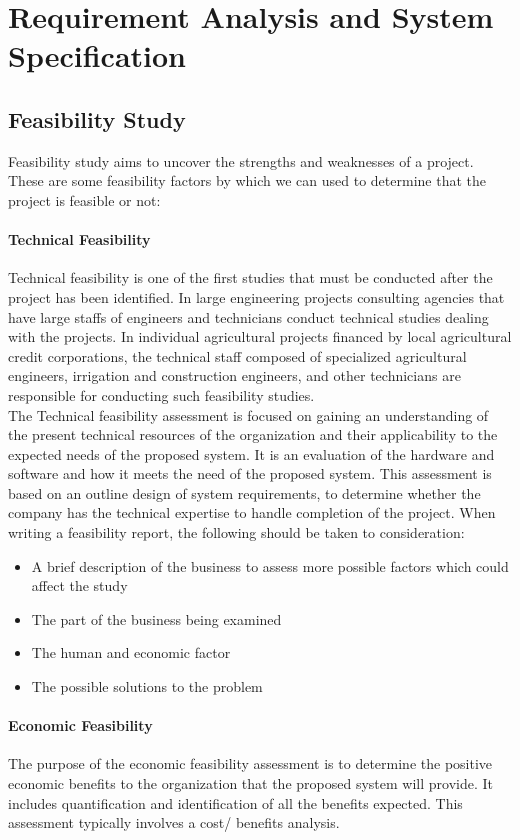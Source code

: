 \chapter{Requirement Analysis and System Specification}

\section{Feasibility Study}
Feasibility study aims to uncover the strengths and weaknesses of
a project. These are some feasibility factors by which we can used to determine that the project is feasible or not:
    \subsubsection{Technical Feasibility}
Technical feasibility is one of the first studies that must be conducted after the project has been identified. In large engineering projects consulting agencies that have large staffs of engineers and technicians conduct technical studies dealing with the projects. In individual agricultural projects financed by local agricultural credit corporations, the technical staff composed of specialized agricultural engineers, irrigation and construction engineers, and other technicians are responsible for conducting such feasibility studies.\\ The Technical feasibility assessment is focused on gaining an understanding of the present technical resources of the organization and their applicability to the expected needs of the proposed system. It is an evaluation of the hardware and software and how it meets the need of the proposed system. This assessment is based on an outline design of system requirements, to determine whether the company has the technical expertise to handle completion of the project. When writing a feasibility report, the following should be taken to consideration:
\begin{itemize}
    \item A brief description of the business to assess more possible factors which could affect the study
    \item The part of the business being examined
    \item The human and economic factor
    \item The possible solutions to the problem
\end{itemize}
 \subsubsection{Economic Feasibility}
The purpose of the economic feasibility assessment is to determine the positive economic benefits to the organization that the proposed system will provide. It includes quantification and identification of all the benefits expected. This assessment typically involves a cost/ benefits analysis.\\

